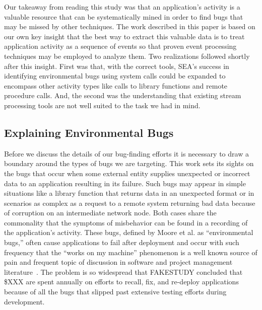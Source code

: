 Our takeaway
from reading this study
was that an application's activity
is a valuable resource that can be systematically mined
in order to find bugs
that may be missed by other techniques.
The work described in this paper
is based on our own key insight that the best way to extract this
valuable data
is to treat application activity
as a sequence of events
so that proven event processing techniques
may be employed to analyze them.
Two realizations followed shortly after this
insight.
First was that, with the correct tools,
SEA's success in identifying environmental bugs using system calls
could be expanded
to encompass other activity types
like calls to library functions
and remote procedure calls.
And, the second was the understanding that existing
stream processing tools
are not well suited to the
task we had in mind.



\subsection{Explaining Environmental Bugs}

Before we discuss the details of our bug-finding efforts it is necessary to
draw a boundary around the types of bugs we are targeting.
This work sets its sights on the bugs that occur when some external
entity supplies unexpected or incorrect data to an
application resulting in its failure.
Such bugs may appear in simple situations like a library function that
returns data in an unexpected format or in scenarios as complex
as a request to a remote
system returning bad data because of corruption on an intermediate network
node.
Both cases share the commonality that the symptoms of misbehavior
can be found in a recording of the application's activity.
These bugs, defined by Moore et al. as ``environmental bugs,''
often cause applications to fail after deployment
and occur with such frequency
that the ``works on my machine'' phenomenon is a well known
source of pain
and frequent topic of discussion
in software and project management
literature~\cite{notreal}.
The problem is so widespread
that FAKESTUDY concluded
that \$XXX are spent annually on efforts to
recall,
fix,
and re-deploy applications
because of all the bugs
that slipped past extensive testing efforts
during development.

